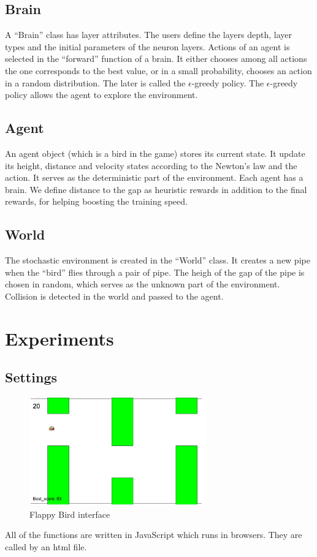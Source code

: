 \documentclass[conference,compsoc]{IEEEtran}
\begin{document}
\subsection{Brain}
A ``Brain'' class has layer attributes. The users define the layers depth, layer types and the initial parameters of the neuron layers. Actions of an agent is selected in the ``forward'' function of a brain. It either chooses among all actions the one corresponds to the best value, or in a small probability, chooses an action in a random distribution. The later is called the $\epsilon$-greedy policy. The $\epsilon$-greedy policy allows the agent to explore the environment. 

\subsection{Agent} 
An agent object (which is a bird in the game) stores its current state. It update its height, distance and velocity states according to the Newton's law and the action. It serves as the deterministic part of the environment. Each agent has a brain. We define distance to the gap as heuristic rewards in addition to the final rewards, for helping boosting the training speed. 

\subsection{World}
The stochastic environment is created in the ``World'' class. It creates a new pipe when the ``bird'' flies through a pair of pipe. The heigh of the gap of the pipe is chosen in random, which serves as the unknown part of the environment. Collision is detected in the world and passed to the agent. 

\section{Experiments}
\subsection{Settings}
\begin{figure}[!t]
\centering
\includegraphics[width=3in]{game.jpg}
\caption{Flappy Bird interface}
\label{fig:game}
\end{figure}
All of the functions are written in JavaScript which runs in browsers. They are called by an html file. 
\end{document}
